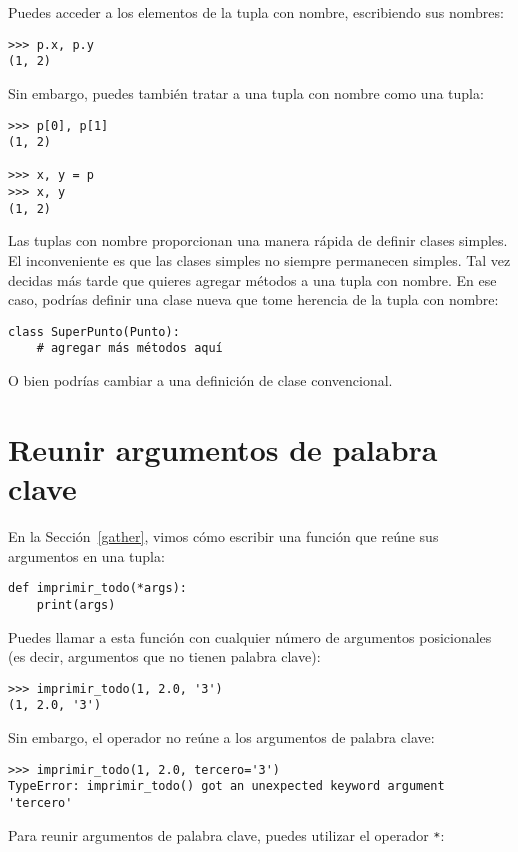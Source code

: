 \documentclass[10pt]{book}
\begin{document}
Puedes acceder a los elementos de la tupla con nombre, escribiendo sus nombres:

\begin{verbatim}
>>> p.x, p.y
(1, 2)
\end{verbatim}

Sin embargo, puedes también tratar a una tupla con nombre como una tupla:

\begin{verbatim}
>>> p[0], p[1]
(1, 2)

>>> x, y = p
>>> x, y
(1, 2)
\end{verbatim}

Las tuplas con nombre proporcionan una manera rápida de definir clases simples.
El inconveniente es que las clases simples no siempre permanecen simples.
Tal vez decidas más tarde que quieres agregar métodos a una tupla con nombre.
En ese caso, podrías definir una clase nueva que tome herencia de
la tupla con nombre:

\begin{verbatim}
class SuperPunto(Punto):
    # agregar más métodos aquí
\end{verbatim}

O bien podrías cambiar a una definición de clase convencional.


\section{Reunir argumentos de palabra clave}

En la Sección~\ref{gather}, vimos cómo escribir una función que
reúne sus argumentos en una tupla:

\begin{verbatim}
def imprimir_todo(*args):
    print(args)
\end{verbatim}
%
Puedes llamar a esta función con cualquier número de argumentos posicionales
(es decir, argumentos que no tienen palabra clave):

\begin{verbatim}
>>> imprimir_todo(1, 2.0, '3')
(1, 2.0, '3')
\end{verbatim}
%
Sin embargo, el operador {\tt *} no reúne a los argumentos de palabra clave:

\begin{verbatim}
>>> imprimir_todo(1, 2.0, tercero='3')
TypeError: imprimir_todo() got an unexpected keyword argument 'tercero'
\end{verbatim}
%
Para reunir argumentos de palabra clave, puedes utilizar el operador {\tt **}:
\end{document}
